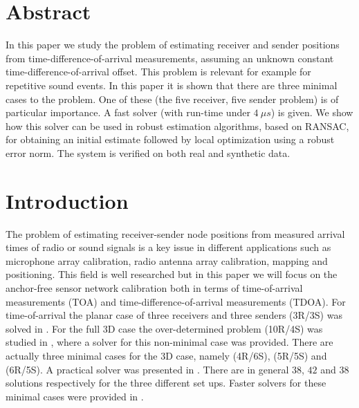 \documentclass[
]{book}
\begin{document}
\hypertarget{sfsabstract}{%
\section*{Abstract}\label{sfsabstract}}

In this paper we study the problem of estimating receiver and sender positions from time-difference-of-arrival measurements, assuming an unknown constant time-difference-of-arrival offset. This problem is relevant for example for repetitive sound events. In this paper it is shown that there are three minimal cases to the problem. One of these (the five receiver, five sender problem) is of particular importance. A fast solver (with run-time under \(4~ \mu s\)) is given. We show how this solver can be used in robust estimation algorithms, based on RANSAC, for obtaining an initial estimate followed by local optimization using a robust error norm. The system is verified on both real and synthetic data.

\newpage

\hypertarget{introduction}{%
\section{Introduction}\label{introduction}}

The problem of estimating receiver-sender node positions from measured arrival times of radio or sound signals is a key issue in different applications such as microphone array calibration, radio antenna array calibration, mapping and positioning. This field is well researched but in this paper we will focus on the anchor-free sensor network calibration both in terms of time-of-arrival measurements (TOA) and time-difference-of-arrival measurements (TDOA).
For time-of-arrival the planar case of three receivers and three senders (3R/3S) was solved in \cite{stewenius-phd-2005}.
For the full 3D case the over-determined problem (10R/4S) was studied in \cite{pollefeys-nister-icassp-08}, where a solver for this non-minimal case was provided. There are actually three minimal cases for the 3D case, namely (4R/6S), (5R/5S) and (6R/5S). A practical solver was presented in
\cite{kuang-burgess-etal-icassp-13}. There are in general \(38\), \(42\) and \(38\) solutions respectively for the three different set ups.
Faster solvers for these minimal cases were provided in \cite{larsson2017polynomial}.
\end{document}
